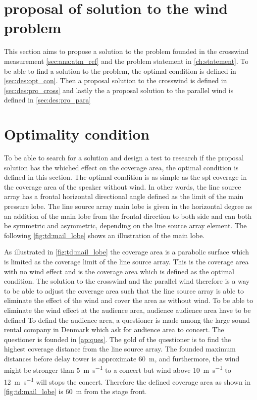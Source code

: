 \section{proposal of solution to the wind problem}\label{sec:td:pro_sol_pro}

This section aims to propose a solution to the problem founded in the crosswind measurement \autoref{sec:ana:atm_ref} and the problem statement in \autoref{ch:statement}. To be able to find a solution to the problem, the optimal condition is defined in \autoref{sec:des:opt_con}. Then a proposal solution to the crosswind is defined in \autoref{sec:des:pro_cross} and lastly the a proposal solution to the parallel wind is defined in \autoref{sec:des:pro_para}


\section{Optimality condition}\label{sec:des:opt_con}

To be able to search for a solution and design a test to research if the proposal solution has the whiched effect on the coverage area, the optimal condition is defined in this section. The optimal condition is as simple as the \gls{spl} coverage in the coverage area of the speaker without wind. In other words, the line source array has a frontal horizontal directional angle defined as the  limit of the main pressure lobe. The line source array main lobe is given in the horizontal degree as an addition of the main lobe from the frontal direction to both side and can both be symmetric and asymmetric, depending on the line source array element. The following \autoref{fig:td:mail_lobe} shows an illustration of the main lobe. 


As illustrated in \autoref{fig:td:mail_lobe} the coverage area is a parabolic surface which is limited as the  coverage limit of the line source array. This is the coverage area with no wind effect and is the coverage area which is defined as the optimal condition. The solution to the crosswind and the parallel wind therefore is a way to be able to adjust the coverage area such that the line source array is able to eliminate the effect of the wind and cover the area as without wind. To be able to eliminate the wind effect at the audience area, audience audience area have to be defined To defind the audience area, a questioner is made among the large sound rental company in Denmark which ask for audience area to concert. The questioner is founded in \autoref{ap:ques}. The gold of the questioner is to find the highest coverage distance from the line source array. The founded maximum distances before delay tower is approximate \SI{60}{\meter}, and furthermore, the wind might be stronger than \SI{5}{\meter\per\second} to a concert but wind above \SI{10}{\meter\per\second} to \SI{12}{\meter\per\second} will stops the concert. Therefore the defined coverage area as shown in \autoref{fig:td:mail_lobe} is \SI{60}{\meter} from the stage front.




